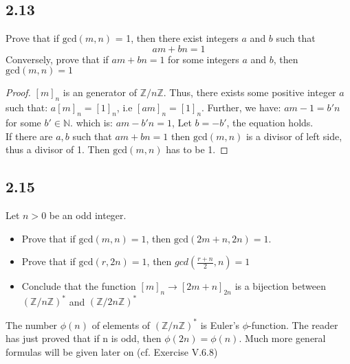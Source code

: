 \documentclass[a4paper, pdf, 12pt]{article}
\begin{document}
\subsection*{2.13} Prove that if $\mbox{gcd}(m, n)$ = 1, then there exist integers $a$ and $b$ such that
$$
  am + bn = 1
$$ Conversely, prove that if $am+ bn = 1$ for some integers $a$ and
$b$, then $\mbox{gcd}(m, n) = 1$
\begin{proof}
  $[m]_{n}$ is an generator of $\mathbb{Z}/n\mathbb{Z}$. Thus, there exists some positive integer $a$ such that:
  $a[m]_{n}=[1]_{n}$, i.e $[am]_{n} = [1]_{n}$. Further, we have: $am - 1 = b'n$ for some $b' \in \mathbb{N}$. which is:
  $am - b'n = 1$, Let $b = -b'$, the equation holds.\\

  If there are $a,b$ such that $am+bn=1$ then $\mbox{gcd}(m,n)$ is a divisor of left side, thus a divisor of 1. Then $\mbox{gcd}(m,n)$ has to be 1.
\end{proof}

\subsection*{2.15} Let $n>0$ be an odd integer.
\begin{itemize}
  \item Prove that if $\mbox{gcd}(m,n) = 1$, then $\mbox{gcd}(2m+ n, 2n) = 1$.
  \item Prove that if $\mbox{gcd}(r, 2n) = 1$, then $gcd(\frac{r+n}{2}, n) = 1$
  \item Conclude that the function $[m]_n \rightarrow [2m + n]_{2n}$ is a bijection between $(\mathbb{Z}/n\mathbb{Z})^{*}$
        and $(\mathbb{Z}/2n\mathbb{Z})^{*}$
\end{itemize}
The number $\phi(n)$ of elements of $(\mathbb{Z}/n\mathbb{Z})^{*}$ is Euler’s $\phi$-function. The reader has just
proved that if n is odd, then $\phi(2n) = \phi(n)$. Much more general formulas will be
given later on (cf. Exercise V.6.8)
\end{document}
